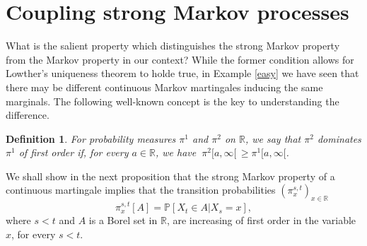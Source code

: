 \documentclass[11pt,a4paper]{article}%
\def\comment#1{\marginpar{\raggedright\scriptsize{\textcolor{purple}{#1}}}}
\newcommand{\ccyan}{\color{cyan}}
\def\P{{\mathbb P}}
\def\R{{\mathbb R}}
\newtheorem{definition}[theorem]{Definition}
\numberwithin{equation}{section}
\begin{document}
\section{Coupling strong Markov processes}

What is the salient property which distinguishes the strong Markov property from the Markov property in our context? While the former condition allows for Lowther's uniqueness theorem to holde true, in Example \ref{easy} we have seen that there may be different continuous Markov martingales inducing the same marginals. The following well-known concept is the key to understanding the difference.



\begin{definition}\label{monotone}
For probability measures $\pi^1$ and $\pi^2$ on $ \R$, we say that $\pi^2$ dominates $\pi^1$ of first order if, for every $a \in \R$, we have $\ \pi^2[a, \infty[\, \ge \pi^1[a, \infty[$.
\end{definition}
 
 We shall show in the next proposition that the strong Markov property of a continuous martingale implies that the transition probabilities $(\pi_x^{s,t})_{x\in \R}$
 \begin{equation}\label{condpro}
 \pi_x^{s,t}[A] = \P [X_t \in A | X_s = x],
 \end{equation}
where $s<t$ and $A$ is a Borel set in $\R$, are increasing of first order in the variable $x$, for every $s<t$.
%
%
%
%
%
%
%
%
\end{document}
